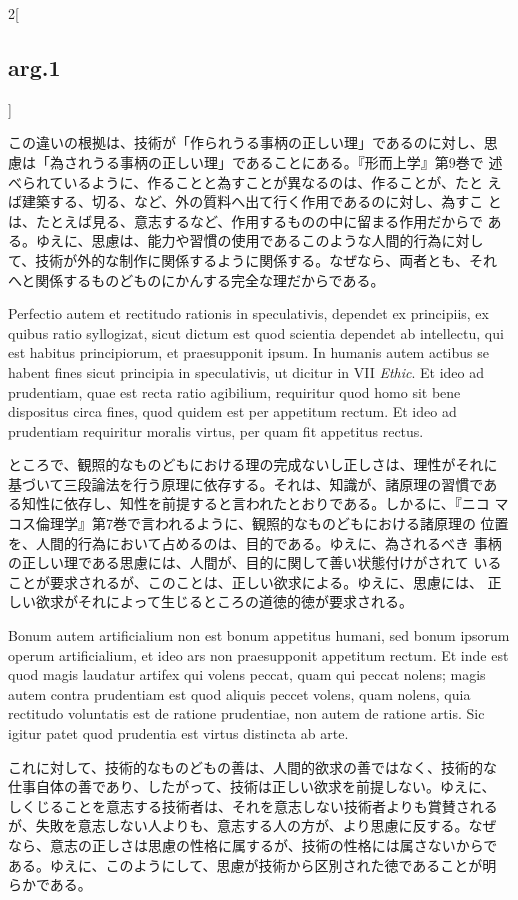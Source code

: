 \documentclass[paper=a4paper,fontsize=10pt,jafontsize=9pt,titlepage]{jlreq}
\begin{document}
\begin{paracol}{2}[\subsection{arg.1}]
\switchcolumn

この違いの根拠は、技術が「作られうる事柄の正しい理」であるのに対し、思
慮は「為されうる事柄の正しい理」であることにある。『形而上学』第9巻で
述べられているように、作ることと為すことが異なるのは、作ることが、たと
えば建築する、切る、など、外の質料へ出て行く作用であるのに対し、為すこ
とは、たとえば見る、意志するなど、作用するものの中に留まる作用だからで
ある。ゆえに、思慮は、能力や習慣の使用であるこのような人間的行為に対し
て、技術が外的な制作に関係するように関係する。なぜなら、両者とも、それ
へと関係するものどものにかんする完全な理だからである。

\switchcolumn*

Perfectio autem et rectitudo rationis in speculativis, dependet ex
principiis, ex quibus ratio syllogizat, sicut dictum est quod scientia
dependet ab intellectu, qui est habitus principiorum, et praesupponit
ipsum. In humanis autem actibus se habent fines sicut principia in
speculativis, ut dicitur in VII {\itshape Ethic}. Et ideo ad
prudentiam, quae est recta ratio agibilium, requiritur quod homo sit
bene dispositus circa fines, quod quidem est per appetitum rectum. Et
ideo ad prudentiam requiritur moralis virtus, per quam fit appetitus
rectus.

\switchcolumn

ところで、観照的なものどもにおける理の完成ないし正しさは、理性がそれに
基づいて三段論法を行う原理に依存する。それは、知識が、諸原理の習慣であ
る知性に依存し、知性を前提すると言われたとおりである。しかるに、『ニコ
マコス倫理学』第7巻で言われるように、観照的なものどもにおける諸原理の
位置を、人間的行為において占めるのは、目的である。ゆえに、為されるべき
事柄の正しい理である思慮には、人間が、目的に関して善い状態付けがされて
いることが要求されるが、このことは、正しい欲求による。ゆえに、思慮には、
正しい欲求がそれによって生じるところの道徳的徳が要求される。

\switchcolumn*

Bonum autem artificialium non est bonum appetitus humani, sed bonum
ipsorum operum artificialium, et ideo ars non praesupponit appetitum
rectum. Et inde est quod magis laudatur artifex qui volens peccat,
quam qui peccat nolens; magis autem contra prudentiam est quod aliquis
peccet volens, quam nolens, quia rectitudo voluntatis est de ratione
prudentiae, non autem de ratione artis. Sic igitur patet quod
prudentia est virtus distincta ab arte.

\switchcolumn

これに対して、技術的なものどもの善は、人間的欲求の善ではなく、技術的な
仕事自体の善であり、したがって、技術は正しい欲求を前提しない。ゆえに、
しくじることを意志する技術者は、それを意志しない技術者よりも賞賛される
が、失敗を意志しない人よりも、意志する人の方が、より思慮に反する。なぜ
なら、意志の正しさは思慮の性格に属するが、技術の性格には属さないからで
ある。ゆえに、このようにして、思慮が技術から区別された徳であることが明
らかである。


\end{paracol}
\end{document}
